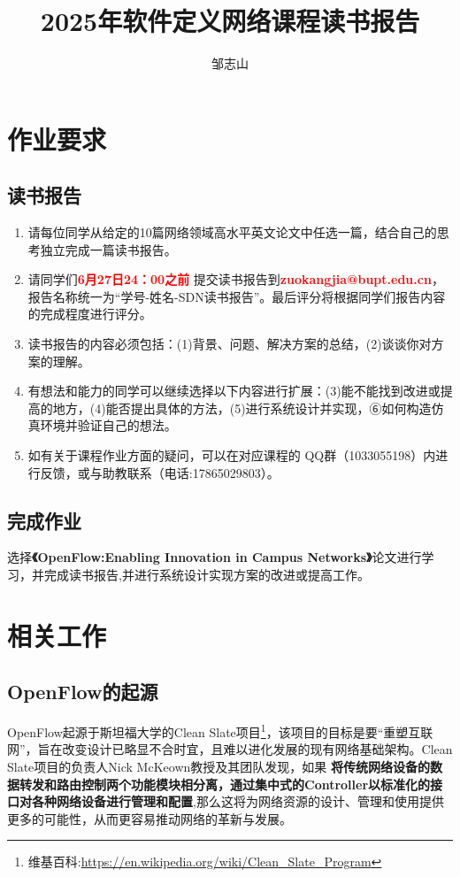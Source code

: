 \documentclass{article}
\author{邹志山}
\affil{人工智能学院\quad  2022219106班 \quad 2022212133}
\title{2025年软件定义网络课程读书报告}
\begin{document}
\maketitle


\section{作业要求}
\subsection*{\textbf{读书报告}} 

\begin{enumerate}

    \item 请每位同学从给定的10篇网络领域高水平英文论文中任选一篇，结合自己的思考独立完成一篇读书报告。
    \item 请同学们\textbf{\textcolor{red}{6月27日24：00之前}}
    提交读书报告到\textbf{\textcolor{red}{zuokangjia@bupt.edu.cn}}，报告名称统一为“学号-姓名-SDN读书报告”。最后评分将根据同学们报告内容的完成程度进行评分。
    \item 读书报告的内容必须包括：(1)背景、问题、解决方案的总结，(2)谈谈你对方案的理解。
    \item 有想法和能力的同学可以继续选择以下内容进行扩展：(3)能不能找到改进或提高的地方，(4)能否提出具体的方法，(5)进行系统设计并实现，⑥如何构造仿真环境并验证自己的想法。
    \item 如有关于课程作业方面的疑问，可以在对应课程的  QQ群（1033055198）内进行反馈，或与助教联系（电话:17865029803）。

\end{enumerate}

\subsection*{\textbf{完成作业}}
\quad\quad 选择\textbf{《OpenFlow:Enabling Innovation in Campus Networks》}\cite{mckeown2008openflow}论文进行学习，并完成读书报告,并进行系统设计实现方案的改进或提高工作。


\section{相关工作}
\subsection{\textbf{OpenFlow的起源}}
\quad\quad OpenFlow起源\cite{huawei_openflow}于斯坦福大学的Clean Slate项目\footnote{维基百科:\url{https://en.wikipedia.org/wiki/Clean_Slate_Program}}，该项目的目标是要“重塑互联网”，旨在改变设计已略显不合时宜，且难以进化发展的现有网络基础架构。Clean Slate项目的负责人Nick McKeown教授及其团队发现，如果
\textbf{将传统网络设备的数据转发和路由控制两个功能模块相分离，通过集中式的Controller以标准化的接口对各种网络设备进行管理和配置},那么这将为网络资源的设计、管理和使用提供更多的可能性，从而更容易推动网络的革新与发展。
\end{document}
